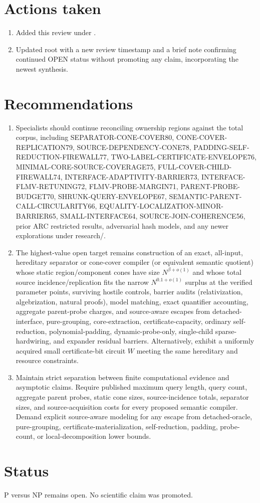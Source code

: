 \documentclass[11pt]{article}
\begin{document}
\section{Actions taken}
\begin{enumerate}
\item Added this review under .
\item Updated root  with a new review timestamp and a brief note confirming continued OPEN status without promoting any claim, incorporating the newest synthesis.
\end{enumerate}

\section{Recommendations}
\begin{enumerate}
\item Specialists should continue reconciling ownership regions against the total corpus, including SEPARATOR-CONE-COVER80, CONE-COVER-REPLICATION79, SOURCE-DEPENDENCY-CONE78, PADDING-SELF-REDUCTION-FIREWALL77, TWO-LABEL-CERTIFICATE-ENVELOPE76, MINIMAL-CORE-SOURCE-COVERAGE75, FULL-COVER-CHILD-FIREWALL74, INTERFACE-ADAPTIVITY-BARRIER73, INTERFACE-FLMV-RETUNING72, FLMV-PROBE-MARGIN71, PARENT-PROBE-BUDGET70, SHRUNK-QUERY-ENVELOPE67, SEMANTIC-PARENT-CALL-CIRCULARITY66, EQUALITY-LOCALIZATION-MINOR-BARRIER65, SMALL-INTERFACE64, SOURCE-JOIN-COHERENCE56, prior ARC restricted results, adversarial hash models, and any newer explorations under research/.
\item The highest-value open target remains construction of an exact, all-input, hereditary separator or cone-cover compiler (or equivalent semantic quotient) whose static region/component cones have size $N^{\beta+o(1)}$ and whose total source incidence/replication fits the narrow $N^{0.1+o(1)}$ surplus at the verified parameter points, surviving hostile controls, barrier audits (relativization, algebrization, natural proofs), model matching, exact quantifier accounting, aggregate parent-probe charges, and source-aware escapes from detached-interface, pure-grouping, core-extraction, certificate-capacity, ordinary self-reduction, polynomial-padding, dynamic-probe-only, single-child sparse-hardwiring, and expander residual barriers. Alternatively, exhibit a uniformly acquired small certificate-bit circuit $W$ meeting the same hereditary and resource constraints.
\item Maintain strict separation between finite computational evidence and asymptotic claims. Require published maximum query length, query count, aggregate parent probes, static cone sizes, source-incidence totals, separator sizes, and source-acquisition costs for every proposed semantic compiler. Demand explicit source-aware modeling for any escape from detached-oracle, pure-grouping, certificate-materialization, self-reduction, padding, probe-count, or local-decomposition lower bounds.
\end{enumerate}

\section{Status}
P versus NP remains open. No scientific claim was promoted.

\end{document}
